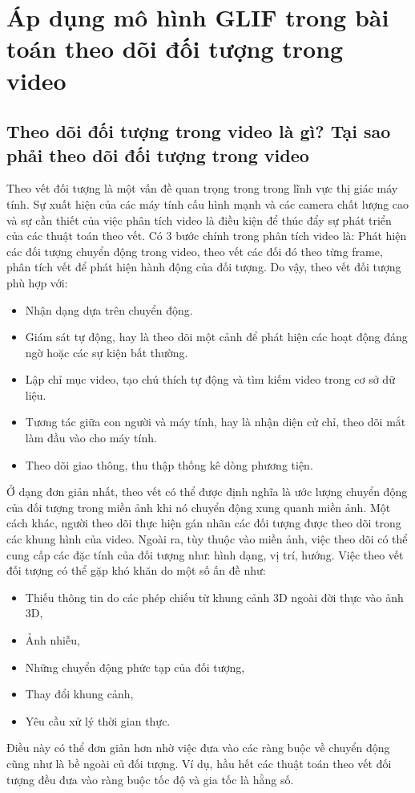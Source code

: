 \documentclass[12pt, oneside, a4paper]{book}
\begin{document}
\chapter{Áp dụng mô hình GLIF trong bài toán theo dõi đối tượng trong video }
\section{Theo dõi đối tượng trong video là gì? Tại sao phải theo dõi đối tượng trong video}
Theo vết đối tượng là một vấn đề quan trọng trong trong lĩnh vực thị giác máy tính. Sự xuất hiện của các máy tính cấu hình mạnh và các camera chất lượng cao và sự cần thiết của việc phân tích video  là điều kiện để thúc đẩy sự phát triển của các thuật toán theo vết. Có 3 bước chính trong phân tích video là: Phát hiện các đối tượng chuyển động trong video, theo vết các đối đó theo từng frame, phân tích vết để phát hiện hành động của đối tượng. Do vậy, theo vết đối tượng phù hợp với: 
\begin{itemize}
\item Nhận dạng dựa trên chuyển động.
\item Giám sát tự động, hay là theo dõi một cảnh để phát hiện các hoạt động đáng ngờ hoặc các sự kiện bất thường.
\item Lập chỉ mục video, tạo chú thích tự động và tìm kiếm video trong cơ sở dữ liệu.
\item Tương tác giữa con người và máy tính, hay là nhận diện cử chỉ, theo dõi mắt làm đầu vào cho máy tính. 
\item Theo dõi giao thông, thu thập thống kê dòng phương tiện.
\end{itemize}
Ở dạng đơn giản nhất, theo vết có thể được định nghĩa là ước lượng chuyển động của đối tượng trong miền ảnh khi nó chuyển động xung quanh miền ảnh. Một cách khác, người theo dõi thực hiện gán nhãn các đối tượng được theo dõi trong các khung hình của video. Ngoài ra, tùy thuộc vào miền ảnh, việc theo dõi có thể cung cấp các đặc tính của đối tượng như: hình dạng, vị trí, hướng. Việc theo vết đối tượng có thể gặp khó khăn do một số ấn đề như: 
\begin{itemize}
\item Thiếu thông tin do các phép chiếu từ khung cảnh 3D ngoài đời thực vào ảnh 3D,
\item Ảnh nhiễu,
\item Những chuyển động phức tạp của đối tượng,
\item Thay đổi khung cảnh,
\item Yêu cầu xử lý thời gian thực.
\end{itemize} 
Điều này có thể đơn giản hơn nhờ việc đưa vào các ràng buộc về chuyển động cũng như là bề ngoài củ đối tượng. Ví dụ, hầu hết các thuật toán theo vết đối tượng đều đưa vào ràng buộc tốc độ và gia tốc là hằng số. 
\end{document}

